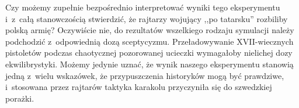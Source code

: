 Czy możemy zupełnie bezpośrednio interpretować wyniki tego eksperymentu i~z~całą stanowczością stwierdzić, że rajtarzy wojujący ,,po tatarsku'' rozbiliby polską armię? Oczywiście nie, do rezultatów wszelkiego rodzaju symulacji należy podchodzić z~odpowiednią dozą sceptycyzmu. Przeładowywanie XVII-wiecznych pistoletów podczas chaotycznej pozorowanej ucieczki wymagałoby nielichej dozy ekwilibrystyki. Możemy jedynie uznać, że wynik naszego eksperymentu stanowią jedną z~wielu wskazówek, że przypuszczenia historyków mogą być prawdziwe, i~stosowana przez rajtarów taktyka karakolu przyczyniła się do szwedzkiej porażki.

\eject
\normalsize
